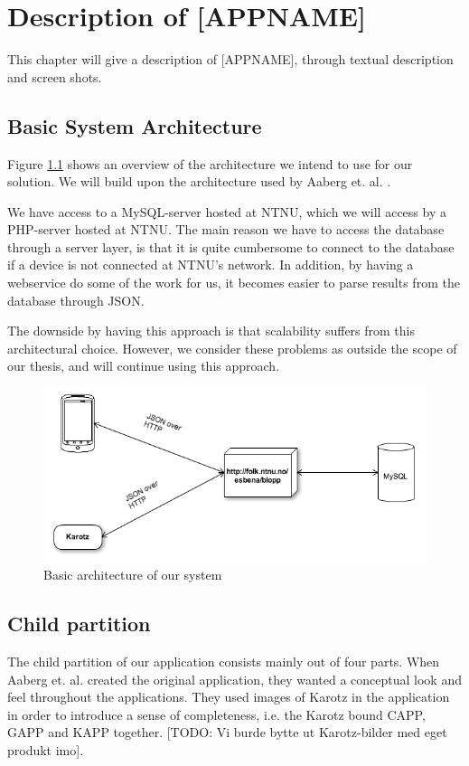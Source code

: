 \chapter{Description of [APPNAME]}
\label{chp:description}

This chapter will give a description of [APPNAME], through textual description and screen shots.

\section{Basic System Architecture}
Figure \ref{fig:basic-architecture} shows an overview of the architecture we intend to use for our solution. We will build upon the architecture used by Aaberg et. al. \cite{CustomerDriven}.

We have access to a MySQL-server hosted at NTNU, which we will access by a PHP-server hosted at NTNU. The main reason we have to access the database through a server layer, is that it is quite cumbersome to connect to the database if a device is not connected at NTNU's network. In addition, by having a webservice do some of the work for us, it becomes easier to parse results from the database through JSON.   


The downside by having this approach is that scalability suffers from this architectural choice. However, we consider these problems as outside the scope of our thesis, and will continue using this approach.

\begin{figure}
		\centering
			\includegraphics[width=0.50\paperwidth]{Pictures/basic-architecture.png}
		\caption{Basic architecture of our system}
		\label{fig:basic-architecture}
\end{figure}

\section{Child partition}
The child partition of our application consists mainly out of four parts. When Aaberg et. al. created the original application, they wanted a conceptual look and feel throughout the applications. They used images of Karotz in the application in order to introduce a sense of completeness, i.e. the Karotz bound CAPP, GAPP and KAPP together. [TODO: Vi burde bytte ut Karotz-bilder med eget produkt imo]. 

